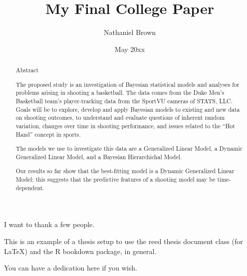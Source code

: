 \documentclass[12pt,twoside]{dukestatscithesis}
\title{My Final College Paper}
\author{Nathaniel Brown}
\date{May 20xx}
\theoremstyle{definition}
\theoremstyle{definition}
\theoremstyle{definition}
\theoremstyle{remark}
\begin{document}
  \maketitle

\frontmatter %
\pagestyle{empty} %
  \begin{acknowledgements}
    I want to thank a few people.
  \end{acknowledgements}
  \begin{preface}
    This is an example of a thesis setup to use the reed thesis document
    class (for LaTeX) and the R bookdown package, in general.
  \end{preface}
  \hypersetup{linkcolor=black}
  \setcounter{tocdepth}{2}
  \tableofcontents

  \listoftables

  \listoffigures
  \begin{abstract}
    \chapter{Abstract}\label{abstract}
    
    The proposed study is an investigation of Bayesian statistical models
    and analyses for problems arising in shooting a basketball. The data
    comes from the Duke Men's Basketball team's player-tracking data from
    the SportVU cameras of STATS, LLC. Goals will be to explore, develop and
    apply Bayesian models to existing and new data on shooting outcomes, to
    understand and evaluate questions of inherent random variation, changes
    over time in shooting performance, and issues related to the ``Hot
    Hand'' concept in sports.
    
    \par
    
    The models we use to investigate this data are a Generalized Linear
    Model, a Dynamic Generalized Linear Model, and a Bayesian Hierarchichal
    Model.
    
    \par
    
    Our results so far show that the best-fitting model is a Dynamic
    Generalized Linear Model; this suggests that the predictive features of
    a shooting model may be time-dependent.
  \end{abstract}
  \begin{dedication}
    You can have a dedication here if you wish.
  \end{dedication}
\mainmatter %
\pagestyle{fancyplain} %
\end{document}
